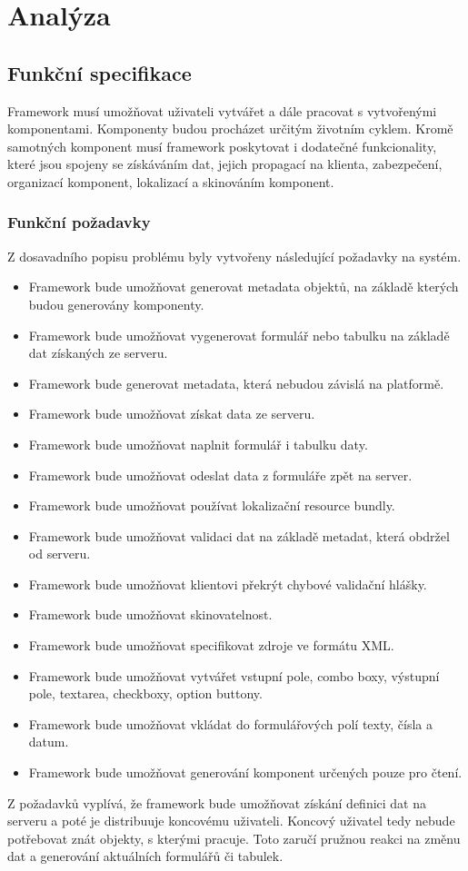 \chapter{Analýza}
\section{Funkční specifikace}
Framework\cite{framework} musí umožňovat uživateli vytvářet a dále pracovat s vytvořenými komponentami. Komponenty budou procházet určitým životním cyklem. Kromě samotných komponent musí framework poskytovat i dodatečné funkcionality, které jsou spojeny se získáváním dat, jejich propagací na klienta, zabezpečení, organizací komponent, lokalizací a skinováním komponent.
\subsection{Funkční požadavky}
Z dosavadního popisu problému byly vytvořeny následující požadavky na systém.
\begin{itemize}
\item Framework bude umožňovat generovat metadata objektů, na základě kterých budou generovány komponenty.
\item Framework bude umožňovat vygenerovat formulář nebo tabulku na základě dat získaných ze serveru.
\item Framework bude generovat metadata, která nebudou závislá na platformě.
\item Framework bude umožňovat získat data ze serveru.
\item Framework bude umožňovat naplnit formulář i tabulku daty.
\item Framework bude umožňovat odeslat data z formuláře zpět na server.
\item Framework bude umožňovat používat lokalizační resource bundly.
\item Framework bude umožňovat validaci dat na základě metadat, která obdržel od serveru.
\item Framework bude umožňovat klientovi překrýt chybové validační hlášky.
\item Framework bude umožňovat skinovatelnost.
\item Framework bude umožňovat specifikovat zdroje ve formátu XML.
\item Framework bude umožňovat vytvářet vstupní pole, combo boxy, výstupní pole, textarea, checkboxy, option buttony.
\item Framework bude umožňovat vkládat do formulářových polí texty, čísla a datum.
\item Framework bude umožňovat generování komponent určených pouze pro čtení. 
\end{itemize} 
Z požadavků vyplívá, že framework bude umožňovat získání definici dat na serveru a poté je distribuuje koncovému uživateli. Koncový uživatel tedy nebude potřebovat znát objekty, s kterými pracuje. Toto zaručí pružnou reakci na změnu dat a generování aktuálních formulářů či tabulek. 
